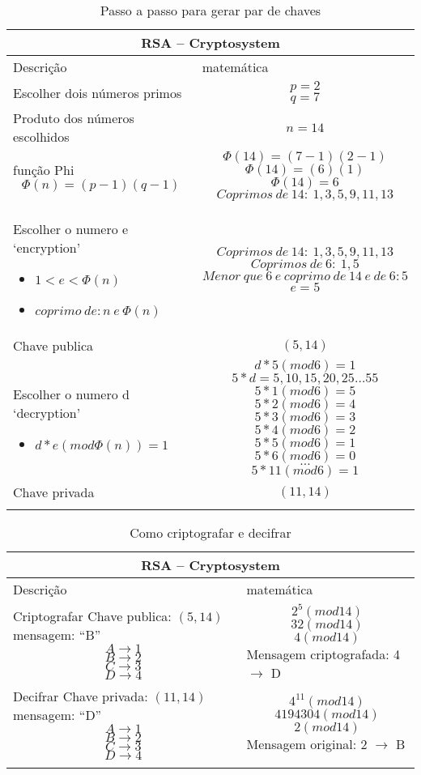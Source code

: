\vspace{1cm}
\begin{longtable}{ |p{6cm}|| p{8cm}|  }
  \hline
  \multicolumn{2}{|c|}{RSA – Cryptosystem} \\
  \hline
    Descrição & matemática\\
  \hline
    Escolher dois números primos & 
    \[p=2\] \[q=7\]\\
  \hline
    Produto dos números escolhidos & 
    \[n=14\]\\
  \hline
    função Phi 
    \[\Phi(n)=(p-1)(q-1)\] & 
    \[\Phi(14)=(7-1)(2-1)\]
    \[\Phi(14)=(6)(1)\]
    \[\Phi(14)=6\]
    \[Coprimos\: de\: 14:\: 1, 3, 5, 9, 11, 13\]\\
  \hline
    Escolher o numero e `encryption'
    \begin{itemize}
      \item $1 < e < \Phi(n)$
      \item $coprimo\: de: n\: e\: \Phi(n)$
    \end{itemize} &
    \[Coprimos\: de\: 14:\: 1, 3, 5, 9, 11, 13\]
    \[Coprimos\: de\: 6:\: 1, 5\]
    \[Menor\: que\: 6\: e\: coprimo\: de\: 14\: e\: de\: 6: 5\]
    \[e = 5\]\\
  \hline
    Chave publica & 
    \[(5, 14)\]\\
  \hline
  Escolher o numero d `decryption'
    \begin{itemize}
      \item $d * e (mod \Phi(n)) = 1$
    \end{itemize} & 
    \[d * 5 (mod 6) = 1\]
    \[5*d = 5, 10, 15, 20, 25 \dots 55\]
    \[5*1 (mod 6) = 5\]
    \[5*2 (mod 6) = 4\]
    \[5*3 (mod 6) = 3\]
    \[5*4 (mod 6) = 2\]
    \[5*5 (mod 6) = 1\]
    \[5*6 (mod 6) = 0\]
    \[ \dots \]
    \[5*11 (mod 6) = 1\] \\
  \hline
  Chave privada & 
  \[(11, 14)\]\\
  \hline
  \caption{Passo a passo para gerar par de chaves}
  \label{table:3}
\end{longtable}

\vspace{1cm}
\begin{longtable}{ |p{6cm}|| p{8cm}|  }
  \hline
  \multicolumn{2}{|c|}{RSA – Cryptosystem} \\
  \hline
    Descrição & matemática\\
  \hline
    Criptografar \newline
    Chave publica: $(5, 14)$ \newline
    mensagem: ``B'' 
    \[A \to 1\]
    \[B \to 2\]
    \[C \to 3\]
    \[D \to 4\] & 
    \[2^5(mod 14)\]
    \[32(mod 14)\]
    \[4(mod 14)\]
    Mensagem criptografada: 4 $\to$ D\\
  \hline
    Decifrar \newline
    Chave privada: $(11, 14)$ \newline
    mensagem: ``D'' 
    \[A \to 1\]
    \[B \to 2\]
    \[C \to 3\]
    \[D \to 4\] & 
    \[4^{11}(mod 14)\]
    \[4194304(mod 14)\]
    \[2(mod 14)\]
    Mensagem original: 2 $\to$ B\\
  \hline
  \caption{Como criptografar e decifrar}
  \label{table:4}
\end{longtable}

